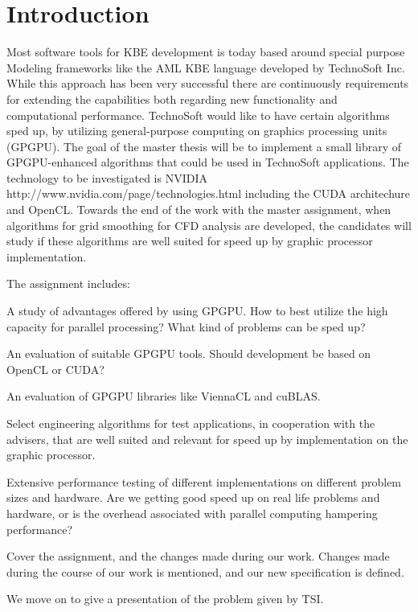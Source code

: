 \chapter{Introduction}

Most software tools for KBE development is today based around special purpose Modeling frameworks like the AML KBE language developed by TechnoSoft Inc. While this approach has been very successful there are continuously requirements for extending the capabilities both regarding new functionality and computational performance. TechnoSoft would like to have certain algorithms sped up, by utilizing general-purpose computing on graphics processing units (GPGPU). The goal of the master thesis will be to implement a small library of GPGPU-enhanced algorithms that could be used in TechnoSoft applications. The technology to be investigated is NVIDIA http://www.nvidia.com/page/technologies.html including the CUDA architechure and OpenCL. Towards the end of the work with the master assignment, when algorithms for grid smoothing for CFD analysis are developed, the candidates will study if these algorithms are well suited for speed up by graphic processor implementation.

The assignment includes:

A study of advantages offered by using GPGPU. How to best utilize the high capacity for parallel processing? What kind of problems can be sped up?

An evaluation of suitable GPGPU tools. Should development be based on OpenCL or CUDA?

An evaluation of GPGPU libraries like ViennaCL and cuBLAS.

Select engineering algorithms for test applications, in cooperation with the advisers, that are well suited and relevant for speed up by implementation on the graphic processor.

Extensive performance testing of different implementations on different problem sizes and hardware. Are we getting good speed up on real life problems and hardware, or is the overhead associated with parallel computing hampering performance?



Cover the assignment, and the changes made during our work. Changes made during the course of our work is mentioned, and our new specification is defined.

We move on to give a presentation of the problem given by TSI.